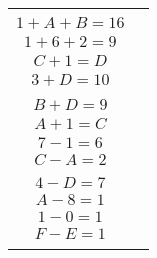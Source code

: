 \documentclass[a4paper,12pt]{article}
\begin{document}
	\begin{center}
		\begin{tabular}{cc}
			\begin{minipage}{0.48\linewidth}
				\begin{enumerate}[label=\alph*)]
					\item $3+F = 12$ \\ $1+A+B=16$ \\ $1+6+2=9$	
				\end{enumerate}
			\end{minipage}
			&
			\begin{minipage}{0.48\linewidth}
				\begin{enumerate}[start=2,label=\alph*)]
					\item $5+A=F$ \\ $C+1=D$ \\ $3+D=10$
				\end{enumerate}
			\end{minipage}
			\\[3em]
			\begin{minipage}{0.48\linewidth}
				\begin{enumerate}[start=3,label=\alph*)]
					\item $C+E=A$ \\ $B+D=9$ \\ $A+1=C$
				\end{enumerate}
			\end{minipage}
			&
			\begin{minipage}{0.48\linewidth}
				\begin{enumerate}[start=4,label=\alph*)]
					\item $19-B=E$ \\ $7-1=6$ \\ $C-A=2$
				\end{enumerate}
			\end{minipage}
			\\[3em]
			\begin{minipage}{0.48\linewidth}
				\begin{enumerate}[start=5,label=\alph*)]
					\item $F-2=D$ \\ $4-D=7$ \\ $A-8=1$
				\end{enumerate}
			\end{minipage}
			&
			\begin{minipage}{0.48\linewidth}
				\begin{enumerate}[start=6,label=\alph*)]
					\item $11-9=7$ \\ $1-0=1$ \\ $F-E=1$ \\
				\end{enumerate}
			\end{minipage}
		\end{tabular}
	\end{center} 
	
\end{document}
